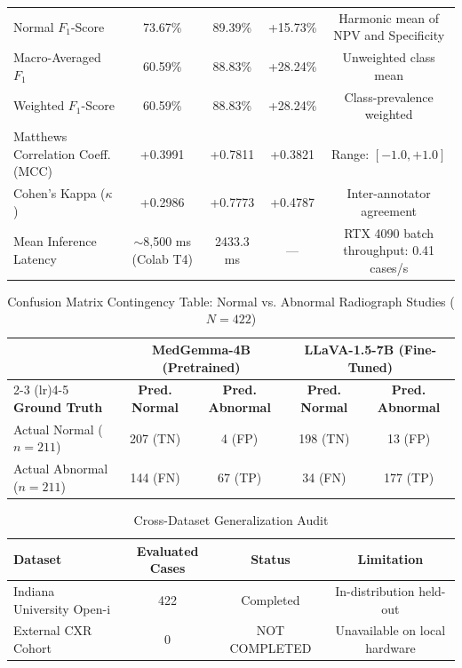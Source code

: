 \documentclass{IEEEtran}
\begin{document}
\begin{table}[t]
\begin{tabular}{lcccc}
Normal $F_1$-Score                     & 73.67\% & 89.39\% & +15.73\% & Harmonic mean of NPV and Specificity \\
Macro-Averaged $F_1$                   & 60.59\% & 88.83\% & +28.24\% & Unweighted class mean \\
Weighted $F_1$-Score                   & 60.59\% & 88.83\% & +28.24\% & Class-prevalence weighted \\
Matthews Correlation Coeff. (MCC)      & +0.3991 & +0.7811 & +0.3821 & Range: $[-1.0, +1.0]$ \\
Cohen's Kappa ($\kappa$)               & +0.2986 & +0.7773 & +0.4787 & Inter-annotator agreement \\
\midrule
Mean Inference Latency                 & $\sim$8,500 ms (Colab T4) & 2433.3 ms & --- & RTX 4090 batch throughput: 0.41 cases/s \\
\bottomrule
\end{tabular}
\end{table}

\begin{table}[h]
\centering
\caption{Confusion Matrix Contingency Table: Normal vs. Abnormal Radiograph Studies ($N=422$)}
\label{tab:cm_contingency}
\begin{tabular}{lcccc}
\toprule
& \multicolumn{2}{c}{\textbf{MedGemma-4B (Pretrained)}} & \multicolumn{2}{c}{\textbf{LLaVA-1.5-7B (Fine-Tuned)}} \\
\cmidrule(lr){2-3} \cmidrule(lr){4-5}
\textbf{Ground Truth} & \textbf{Pred. Normal} & \textbf{Pred. Abnormal} & \textbf{Pred. Normal} & \textbf{Pred. Abnormal} \\
\midrule
Actual Normal ($n=211$)   & 207 (TN) & 4 (FP) & 198 (TN) & 13 (FP) \\
Actual Abnormal ($n=211$) & 144 (FN) & 67 (TP) & 34 (FN) & 177 (TP) \\
\bottomrule
\end{tabular}
\end{table}

\begin{table}[h]
\centering
\caption{Cross-Dataset Generalization Audit}
\label{tab:cross_dataset}
\begin{tabular}{lccc}
\toprule
\textbf{Dataset} & \textbf{Evaluated Cases} & \textbf{Status} & \textbf{Limitation} \\
\midrule
Indiana University Open-i & 422 & Completed & In-distribution held-out \\
External CXR Cohort & 0 & NOT COMPLETED & Unavailable on local hardware \\
\bottomrule
\end{tabular}
\end{table}
\end{document}
